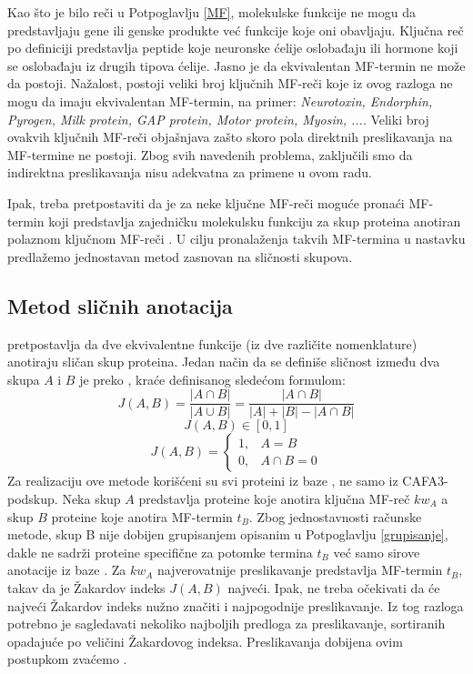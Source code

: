 Kao što je bilo reči u Potpoglavlju \ref{MF}, molekulske funkcije ne mogu da
predstavljaju gene ili genske produkte već funkcije koje oni obavljaju. Ključna
reč  po definiciji predstavlja peptide koje neuronske
ćelije oslobađaju ili hormone koji se oslobađaju iz drugih tipova ćelije. Jasno
je da ekvivalentan MF-termin ne može da postoji.  Nažalost, postoji veliki broj
ključnih MF-reči  koje iz ovog razloga ne mogu da imaju ekvivalentan MF-termin,
na primer: \textit{ Neurotoxin, Endorphin, Pyrogen, Milk protein, GAP protein,
Motor protein, Myosin, ...}. Veliki broj ovakvih ključnih MF-reči  objašnjava 
zašto skoro pola direktnih preslikavanja na MF-termine ne postoji.  Zbog svih
navedenih problema, zaključili smo da indirektna preslikavanja nisu adekvatna za
primene u ovom radu.

Ipak, treba pretpostaviti da je za neke ključne MF-reči moguće pronaći MF-termin
koji predstavlja zajedničku molekulsku funkciju za skup proteina anotiran
polaznom ključnom MF-reči .  U cilju pronalaženja takvih MF-termina u nastavku
predlažemo jednostavan metod zasnovan na sličnosti skupova.

\subsection{Metod sličnih anotacija}

 pretpostavlja da dve ekvivalentne funkcije (iz dve
različite nomenklature) anotiraju sličan skup proteina.  Jedan način da se
definiše sličnost između dva skupa $A$ i $B$ je preko 
, kraće   definisanog sledećom formulom:
$$J(A,B) = \dfrac{|A \cap B|}{|A \cup B|} =  \dfrac{|A \cap B|}{|A|+|B|-|A \cap B|}$$
$$  J(A,B) \in [0, 1] $$
\[   
  J(A,B) = 
    \begin{cases}
      1,&A=B  \\
      0,&A\cap B=0
    \end{cases}
\]
Za realizaciju ove metode korišćeni su svi proteini iz baze \swissprot, ne samo iz
CAFA3-podskup.  Neka skup $A$ predstavlja proteine koje anotira ključna MF-reč  $kw_A$
a skup $B$ proteine koje anotira MF-termin $t_B$.  Zbog jednostavnosti računske
metode, skup B nije dobijen grupisanjem opisanim u Potpoglavlju
\ref{grupisanje}, dakle ne sadrži proteine specifične za potomke termina $t_B$
već samo sirove anotacije iz baze \swissprot.  Za $kw_A$ najverovatnije
preslikavanje predstavlja MF-termin $t_B$, takav da je Žakardov indeks $J(A,B)$
najveći.  Ipak, ne treba očekivati da će najveći Žakardov indeks nužno značiti
i najpogodnije preslikavanje. Iz tog razloga potrebno je  sagledavati nekoliko
najboljih predloga za preslikavanje, sortiranih opadajuće po veličini
Žakardovog indeksa. Preslikavanja dobijena ovim postupkom zvaćemo
.

